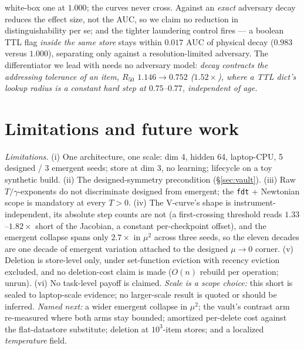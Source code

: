 \documentclass{article}
\begin{document}
white-box one at $1.000$; the curves never cross. Against an \emph{exact} adversary decay reduces the effect size, not the AUC, so we claim no reduction in distinguishability per se; and the tighter laundering control fires --- a boolean TTL flag \emph{inside the same store} stays within $0.017$ AUC of physical decay ($0.983$ versus $1.000$), separating only against a resolution-limited adversary. The differentiator we lead with needs no adversary model: \emph{decay contracts the addressing tolerance of an item, $R_{50}$ $1.146\to0.752$ ($1.52\times$), where a TTL dict's lookup radius is a constant hard step at $0.75$--$0.77$, independent of age.}

\section{Limitations and future work}\label{sec:limits}

{\footnotesize\emph{Limitations.} (i) One architecture, one scale: dim 4, hidden 64, laptop-CPU, 5 designed / 3 emergent seeds; store at dim 3, no learning; lifecycle on a toy synthetic build. (ii) The designed-symmetry precondition (\S\ref{sec:vault}). (iii) Raw $T/\gamma$-exponents do not discriminate designed from emergent; the \texttt{fdt} + Newtonian scope is mandatory at every $T>0$. (iv) The V-curve's shape is instrument-independent, its absolute step counts are not (a first-crossing threshold reads $1.33$--$1.82\times$ short of the Jacobian, a constant per-checkpoint offset), and the emergent collapse spans only $2.7\times$ in $\mu^2$ across three seeds, so the eleven decades are one decade of emergent variation attached to the designed $\mu\to0$ corner. (v) Deletion is store-level only, under set-function eviction with recency eviction excluded, and no deletion-cost claim is made ($O(n)$ rebuild per operation; unrun). (vi) No task-level payoff is claimed. \emph{Scale is a scope choice:} this short is sealed to laptop-scale evidence; no larger-scale result is quoted or should be inferred. \emph{Named next:} a wider emergent collapse in $\mu^2$; the vault's contrast arm re-measured where both arms stay bounded; amortized per-delete cost against the flat-datastore substitute; deletion at $10^3$-item stores; and a localized \emph{temperature} field.\par}

\clearpage
\appendix
\footnotesize
\end{document}
